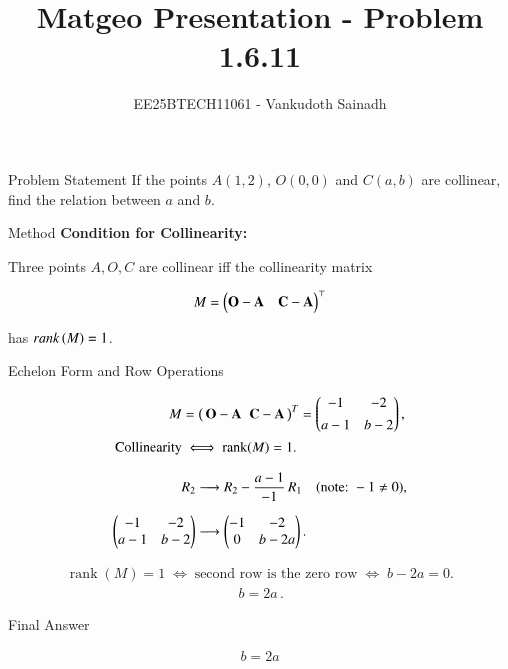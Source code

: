 \documentclass{beamer}
\title{Matgeo Presentation - Problem 1.6.11}
\author{EE25BTECH11061 - Vankudoth Sainadh}
\begin{document}
\begin{frame}
  \titlepage
\end{frame}

\begin{frame}{Problem Statement}
If the points $A(1,2)$, $O(0,0)$ and $C(a,b)$ are collinear, find the relation between $a$ and $b$.

\end{frame}

\begin{frame}{Method}
\textbf{Condition for Collinearity:}

Three points $A, O, C$ are collinear iff the collinearity matrix

\begin{align*}
M=\begin{pmatrix} \mathbf{O}-\mathbf{A} & \mathbf{C}-\mathbf{A} \end{pmatrix}^\top
\end{align*}

has $rank\left(M\right)=1$.

\end{frame}

\begin{frame}{Echelon Form and Row Operations}

\begin{align*}
M &= \big(\,\mathbf{O}-\mathbf{A}\;\; \mathbf{C}-\mathbf{A}\,\big)^{T}
   = \begin{pmatrix}-1 & -2\\[4pt] a-1 & b-2\end{pmatrix},\\
\text{Collinearity} &\iff \operatorname{rank}(M)=1.
\end{align*}

\begin{align*}
R_2 &\longrightarrow R_2 - \frac{a-1}{-1}\,R_1
\quad (\text{note: }-1\neq 0),\\[6pt]
\begin{pmatrix}-1 & -2\\ a-1 & b-2\end{pmatrix}
&\longrightarrow
\begin{pmatrix}-1 & -2\\ 0  & b-2a\end{pmatrix}.
\end{align*}

\begin{align*}
\operatorname{rank}(M)=1
\;\Longleftrightarrow\;
\text{second row is the zero row}
\;\Longleftrightarrow\;
b-2a=0.
\end{align*}
\begin{align*}
\boxed{\,b=2a\,}.
\end{align*}

\end{frame}


\begin{frame}{Final Answer}

  \begin{center}
 {\LARGE \begin{align*}
   \boxed{b=2a}  
  \end{align*}}
  \end{center}

\end{frame}
\end{document}
